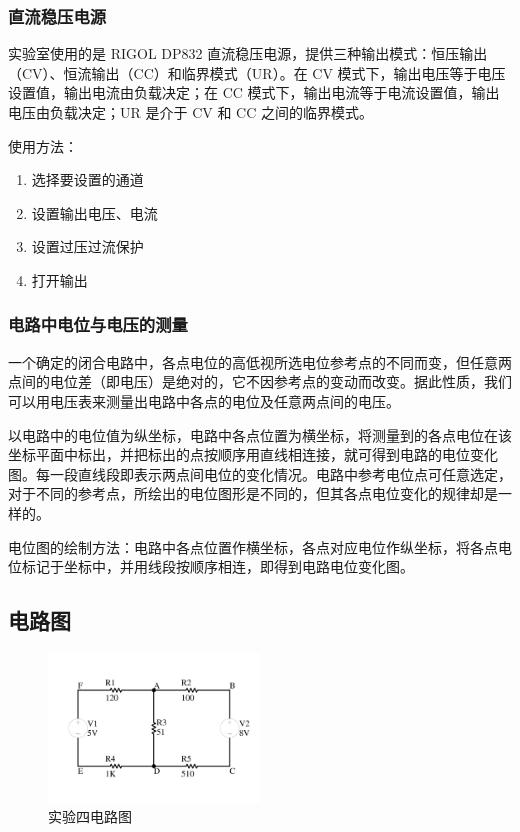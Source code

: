\documentclass[a4paper,utf8]{article}
\begin{document}
    \subsubsection{直流稳压电源}
        实验室使用的是 RIGOL DP832 直流稳压电源，提供三种输出模式：恒压输出（CV）、恒流输出（CC）和临界模式（UR）。在 CV 模式下，输出电压等于电压设置值，输出电流由负载决定；在 CC 模式下，输出电流等于电流设置值，输出电压由负载决定；UR 是介于 CV 和 CC 之间的临界模式。\par
        使用方法：
        \begin{enumerate}
            \item 选择要设置的通道
            \item 设置输出电压、电流
            \item 设置过压过流保护
            \item 打开输出
        \end{enumerate}
        
    \subsubsection{电路中电位与电压的测量}
        一个确定的闭合电路中，各点电位的高低视所选电位参考点的不同而变，但任意两点间的电位差（即电压）是绝对的，它不因参考点的变动而改变。据此性质，我们可以用电压表来测量出电路中各点的电位及任意两点间的电压。\par
        以电路中的电位值为纵坐标，电路中各点位置为横坐标，将测量到的各点电位在该坐标平面中标出，并把标出的点按顺序用直线相连接，就可得到电路的电位变化图。每一段直线段即表示两点间电位的变化情况。电路中参考电位点可任意选定，对于不同的参考点，所绘出的电位图形是不同的，但其各点电位变化的规律却是一样的。\par
        电位图的绘制方法：电路中各点位置作横坐标，各点对应电位作纵坐标，将各点电位标记于坐标中，并用线段按顺序相连，即得到电路电位变化图。
    \subsection{电路图}
    \begin{figure}[!ht]
        \caption{实验四电路图}
        \includegraphics[width=0.5\textwidth]{circuit1s.pdf}
    \end{figure}
\end{document}
